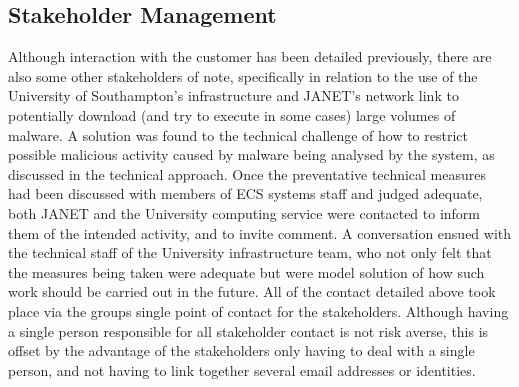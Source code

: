 \subsection{Stakeholder Management}

Although interaction with the customer has been detailed previously, there are
also some other stakeholders of note, specifically in relation to the use of the
University of Southampton's infrastructure and JANET's network link to
potentially download (and try to execute in some cases) large volumes of
malware. A solution was found to the technical challenge of how to restrict
possible malicious activity caused by malware being analysed by the system, as
discussed in the technical approach. Once the preventative technical measures
had been discussed with members of ECS systems staff and judged adequate, both
JANET and the University computing service were contacted to inform them of the
intended activity, and to invite comment. A conversation ensued with the
technical staff of the University infrastructure team, who not only felt that
the measures being taken were adequate but were model solution of how such work
should be carried out in the future. All of the contact detailed above took
place via the groups single point of contact for the stakeholders. Although
having a single person responsible for all stakeholder contact is not risk
averse, this is offset by the advantage of the stakeholders only having to deal
with a single person, and not having to link together several email addresses or
identities.

